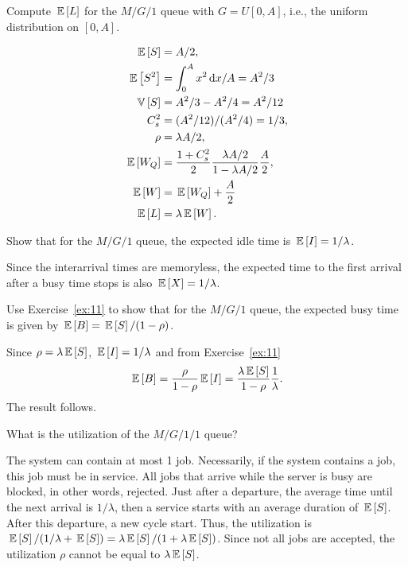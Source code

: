 \begin{question}
  Compute $\,\mathbb{E}\left[L\right]$ for the $M/G/1$ queue with $G=U[0,A]$, i.e., the
  uniform distribution on $[0,A]$.
\begin{solution}
  \begin{align*}
\,\mathbb{E}\left[S\right] &= A/2,\\
\,\mathbb{E}\left[S^2\right] &= \int_0^A x^2 \,\text{d}x/A = A^2/3\\
\,\mathbb{V}\left[S\right] &= A^2/3 - A^2/4= A^2/12\\
C_s^2 &= (A^2/12)/(A^2/4) = 1/3,\\
\rho &= \lambda A/2,\\
\,\mathbb{E}\left[W_Q\right] &= \frac{1+C_s^2}2 \frac{\lambda A/2}{1-\lambda A/2}\frac A2, \\
\,\mathbb{E}\left[W\right] &= \,\mathbb{E}\left[W_Q\right] + \frac A2\\
\,\mathbb{E}\left[L\right] &= \lambda \,\mathbb{E}\left[W\right].
  \end{align*}
\end{solution}
\end{question}


\begin{question}
  Show that for the $M/G/1$ queue, the expected idle time is
  $\,\mathbb{E}\left[I\right] = 1/\lambda$.
  \begin{solution}
  Since the interarrival times are memoryless, the expected
      time to the first arrival after a busy time stops is also
      $\,\mathbb{E}\left[X\right]=1/\lambda$.
  \end{solution}
\end{question}

\begin{question}
  Use Exercise~\ref{ex:11} to show that for the $M/G/1$ queue, the
  expected busy time is given by $\,\mathbb{E}\left[B\right] = \,\mathbb{E}\left[S\right]/(1-\rho)$.
  \begin{solution}
  Since $\rho = \lambda \,\mathbb{E}\left[S\right]$, $\,\mathbb{E}\left[I\right]= 1/\lambda$ and from Exercise~\ref{ex:11}
\begin{equation*}
  \,\mathbb{E}\left[B\right] = \frac{\rho }{1-\rho} \,\mathbb{E}\left[I\right] = \frac{\lambda \,\mathbb{E}\left[S\right]}{1-\rho} \frac1\lambda.
\end{equation*}
The result follows.
  \end{solution}
\end{question}

\begin{question}
 What is the utilization of the $M/G/1/1$ queue?
  \begin{solution}
 The system can contain at most 1 job. Necessarily, if the
      system contains a job, this job must be in service.  All jobs
      that arrive while the server is busy are blocked, in other
      words, rejected.  Just after a departure, the average time until
      the next arrival is $1/\lambda$, then a service starts with an
      average duration of $\,\mathbb{E}\left[S\right]$. After this departure, a new cycle
      start. Thus, the utilization is
      $\,\mathbb{E}\left[S\right]/(1/\lambda + \,\mathbb{E}\left[S\right]) = \lambda \,\mathbb{E}\left[S\right]/ (1 + \lambda \,\mathbb{E}\left[S\right])$.
      Since not all jobs are accepted, the utilization $\rho$ cannot
      be equal to $\lambda \,\mathbb{E}\left[S\right]$.
  \end{solution}
\end{question}

